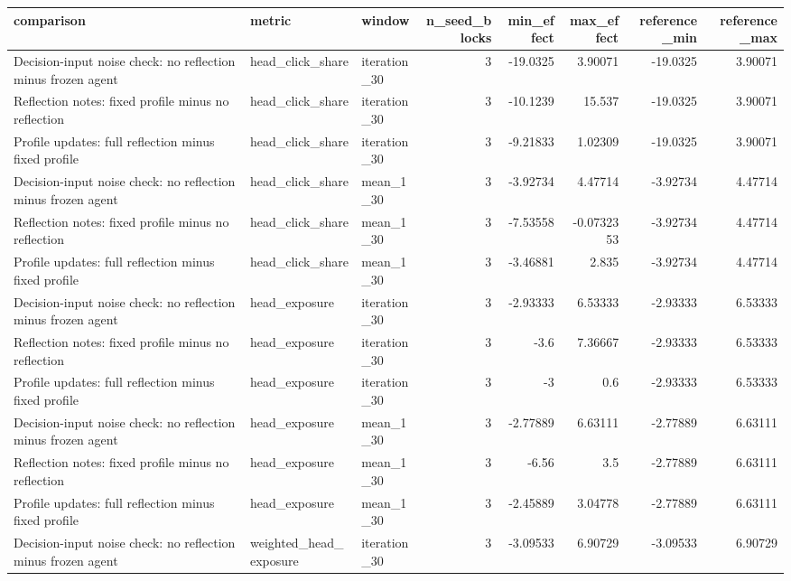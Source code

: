 \begin{table}[htbp!]
\centering
\small
\setlength{\tabcolsep}{3pt}
\renewcommand{\arraystretch}{1.1}
\begin{tabular}{lllrrrrr}
\hline
comparison & metric & window & n\_seed\_blocks & min\_effect & max\_effect & reference\_min & reference\_max \\
\hline
Decision-input noise check: no reflection minus frozen agent & head\_click\_share & iteration\_30 & 3 & -19.0325 & 3.90071 & -19.0325 & 3.90071 \\
Reflection notes: fixed profile minus no reflection & head\_click\_share & iteration\_30 & 3 & -10.1239 & 15.537 & -19.0325 & 3.90071 \\
Profile updates: full reflection minus fixed profile & head\_click\_share & iteration\_30 & 3 & -9.21833 & 1.02309 & -19.0325 & 3.90071 \\
Decision-input noise check: no reflection minus frozen agent & head\_click\_share & mean\_1\_30 & 3 & -3.92734 & 4.47714 & -3.92734 & 4.47714 \\
Reflection notes: fixed profile minus no reflection & head\_click\_share & mean\_1\_30 & 3 & -7.53558 & -0.0732353 & -3.92734 & 4.47714 \\
Profile updates: full reflection minus fixed profile & head\_click\_share & mean\_1\_30 & 3 & -3.46881 & 2.835 & -3.92734 & 4.47714 \\
Decision-input noise check: no reflection minus frozen agent & head\_exposure & iteration\_30 & 3 & -2.93333 & 6.53333 & -2.93333 & 6.53333 \\
Reflection notes: fixed profile minus no reflection & head\_exposure & iteration\_30 & 3 & -3.6 & 7.36667 & -2.93333 & 6.53333 \\
Profile updates: full reflection minus fixed profile & head\_exposure & iteration\_30 & 3 & -3 & 0.6 & -2.93333 & 6.53333 \\
Decision-input noise check: no reflection minus frozen agent & head\_exposure & mean\_1\_30 & 3 & -2.77889 & 6.63111 & -2.77889 & 6.63111 \\
Reflection notes: fixed profile minus no reflection & head\_exposure & mean\_1\_30 & 3 & -6.56 & 3.5 & -2.77889 & 6.63111 \\
Profile updates: full reflection minus fixed profile & head\_exposure & mean\_1\_30 & 3 & -2.45889 & 3.04778 & -2.77889 & 6.63111 \\
Decision-input noise check: no reflection minus frozen agent & weighted\_head\_exposure & iteration\_30 & 3 & -3.09533 & 6.90729 & -3.09533 & 6.90729 \\

\end{tabular}
\end{table}
